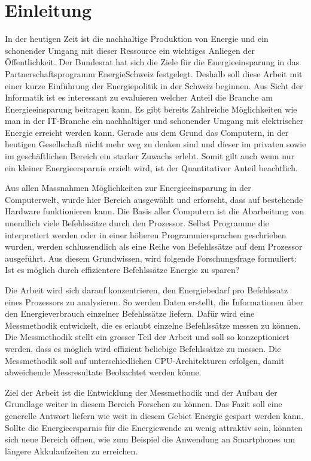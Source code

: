 \chapter{Einleitung}


In der heutigen Zeit ist die nachhaltige Produktion von Energie und ein schonender Umgang mit dieser Ressource ein wichtiges Anliegen der Öffentlichkeit. Der Bundesrat hat sich die Ziele für die Energieeinsparung in das Partnerschaftsprogramm EnergieSchweiz festgelegt. Deshalb soll diese Arbeit mit einer kurze Einführung der Energiepolitik in der Schweiz beginnen. Aus Sicht der Informatik ist es interessant zu evaluieren welcher Anteil die Branche am Energieeinsparung beitragen kann. Es gibt bereits Zahlreiche Möglichkeiten wie man in der IT-Branche ein nachhaltiger und schonender Umgang mit elektrischer Energie erreicht werden kann. Gerade aus dem Grund das Computern, in der heutigen Gesellschaft nicht mehr weg zu denken sind und dieser im privaten sowie im geschäftlichen Bereich ein starker Zuwachs erlebt. Somit gilt auch wenn nur ein kleiner Energieersparnis erzielt wird, ist der Quantitativer Anteil beachtlich.
\par
Aus allen Massnahmen Möglichkeiten zur Energieeinsparung in der Computerwelt, wurde hier Bereich ausgewählt und erforscht, dass auf bestehende Hardware funktionieren kann. Die Basis aller Computern ist die Abarbeitung von unendlich viele Befehlssätze durch den Prozessor. Selbst Programme die interpretiert werden oder in einer höheren Programmiersprachen geschrieben wurden, werden schlussendlich als eine Reihe von Befehlssätze auf dem Prozessor ausgeführt. Aus diesem Grundwissen, wird folgende Forschungsfrage formuliert: Ist es möglich durch effizientere Befehlssätze Energie zu sparen?
\par
Die Arbeit wird sich darauf konzentrieren, den Energiebedarf pro Befehlssatz eines Prozessors zu analysieren. So werden Daten erstellt, die Informationen über den Energieverbrauch einzelner Befehlssätze liefern. Dafür wird eine Messmethodik entwickelt, die es erlaubt einzelne Befehlssätze messen zu können. Die Messmethodik stellt ein grosser Teil der Arbeit und soll so konzeptioniert werden, dass es möglich wird effizient beliebige Befehlssätze zu messen. Die Messmethodik soll auf unterschiedlichen CPU-Architekturen erfolgen, damit abweichende Messresultate Beobachtet werden könne.
\par
Ziel der Arbeit ist die Entwicklung der Messmethodik und der Aufbau der Grundlage weiter in diesem Bereich Forschen zu können. Das Fazit soll eine generelle Antwort liefern wie weit in diesem Gebiet Energie gespart werden kann. Sollte die Energieersparnis für die Energiewende zu wenig attraktiv sein, könnten sich neue Bereich öffnen, wie zum Beispiel die Anwendung an Smartphones um längere Akkulaufzeiten zu erreichen.
